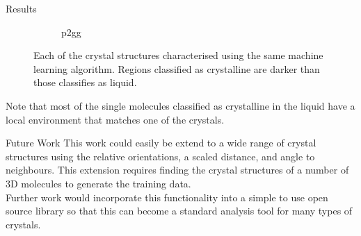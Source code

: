 \documentclass{beamer}
\begin{document}
\begin{frame}[t]{}
\begin{columns}[t]
\begin{column}{0.47\linewidth}
\begin{block}{Results}
\begin{figure}[h]
\begin{subfigure}[t]{\linewidth}
            \caption{p2gg}
            \label{fig:categorised p2gg}
          \end{subfigure}
          \caption{Each of the crystal structures characterised using the same
            machine learning algorithm. Regions classified as crystalline are darker
            than those classifies as liquid.}
          \label{fig:categorised}
        \end{figure}

        Note that most of the single molecules classified as crystalline in the liquid
        have a local environment that matches one of the crystals.

      \end{block}

      \begin{block}{Future Work}
        This work could easily be extend to a wide range of crystal structures
        using the relative orientations, a scaled distance, and angle to neighbours.
        This extension requires finding the crystal structures of a number of 3D molecules
        to generate the training data.\\

        Further work would incorporate this functionality into a simple to use open source library
        so that this can become a standard analysis tool for many types of crystals.

      \vspace{0.75em}
      \end{block}

    \end{column}
  \end{columns}
\end{frame}
\end{document}
